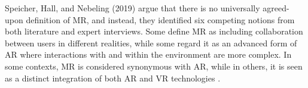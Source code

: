    

    Speicher, Hall, and Nebeling (2019) argue that there is no universally agreed-upon definition of \ac{MR}, and instead, they identified six competing notions from both literature and expert interviews.
    Some define \ac{MR} as including collaboration between users in different realities, while some regard it as an advanced form of \ac{AR} where interactions with and within the environment are more complex. In some contexts, \ac{MR} is considered synonymous with \ac{AR}, while in others, it is seen as a distinct integration of both \ac{AR} and \ac{VR} technologies \cite{whatismixedreality}. 


